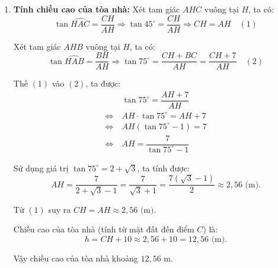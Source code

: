 \begin{baitap}
{\begin{enumerate}
	\item[b)] \textbf{Tính chiều cao của tòa nhà:}
	Xét tam giác $AHC$ vuông tại $H$, ta có:
	$$ \tan \widehat{HAC} = \dfrac{CH}{AH} \Rightarrow \tan 45^\circ = \dfrac{CH}{AH} \Rightarrow CH = AH \quad (1) $$
	
	Xét tam giác $AHB$ vuông tại $H$, ta có:
	$$ \tan \widehat{HAB} = \dfrac{BH}{AH} \Rightarrow \tan 75^\circ = \dfrac{CH + BC}{AH} = \dfrac{CH + 7}{AH} \quad (2) $$
	
	Thế $(1)$ vào $(2)$, ta được:
	\begin{align*}
		& \tan 75^\circ = \dfrac{AH + 7}{AH} \\
		\Leftrightarrow\ & AH \cdot \tan 75^\circ = AH + 7 \\
		\Leftrightarrow\ & AH(\tan 75^\circ - 1) = 7 \\
		\Leftrightarrow\ & AH = \dfrac{7}{\tan 75^\circ - 1} 
	\end{align*}
	
	Sử dụng giá trị $\tan 75^\circ = 2 + \sqrt{3}$, ta tính được:
	$$ AH = \dfrac{7}{2 + \sqrt{3} - 1} = \dfrac{7}{\sqrt{3} + 1} = \dfrac{7(\sqrt{3} - 1)}{2} \approx 2{,}56 \text{ (m)}. $$
	
	Từ $(1)$ suy ra $CH = AH \approx 2{,}56 \text{ (m)}$.
	
	Chiều cao của tòa nhà (tính từ mặt đất đến điểm $C$) là:
	$$ h = CH + 10 \approx 2{,}56 + 10 = 12{,}56 \text{ (m)}. $$
	
	Vậy chiều cao của tòa nhà khoảng $12{,}56 \text{ m}$.
\end{enumerate}}
\end{baitap}

